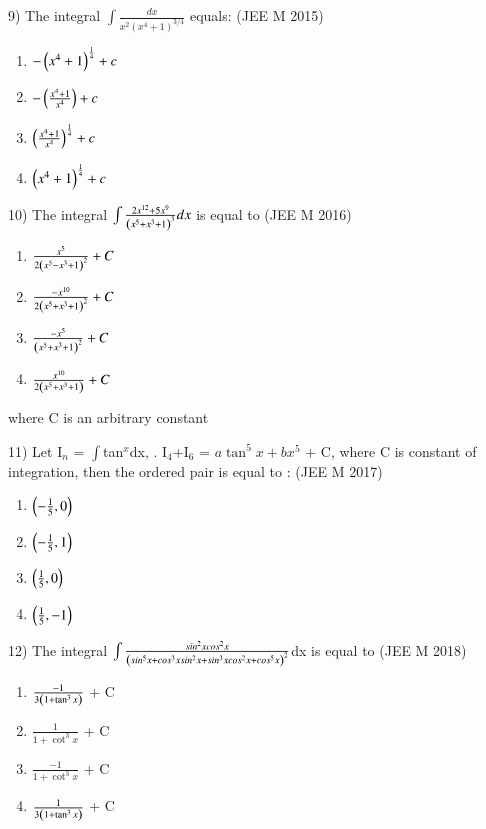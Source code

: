 \documentclass[journal,12pt,twocolumn]{IEEEtran}
\theoremstyle{remark}
\begin{document}
9)
	 The integral $\int\frac{dx}{x^2(x^4+1)^{3/4}}$ equals:
		\hfill{(JEE M 2015)}

		\begin{multicols}{2}
			\begin{enumerate}[label=(\alph*)]
				\item $-\left(x^4+1\right)^{\frac{1}{4}}+c$
				\item $-\left(\frac{x^4+1}{x^4}\right)+c$
				\item $\left(\frac{x^4+1}{x^4}\right)^{\frac{1}{4}}+c$
				\item $\left(x^4+1\right)^{\frac{1}{4}}+c$
			\end{enumerate}
		\end{multicols}

10)
	 The integral $\int\frac{2x^{12}+5x^9}{\left(x^5+x^3+1\right)^3}dx$ is equal to
		\hfill{(JEE M 2016)}

		\begin{multicols}{2}
			\begin{enumerate}[label=(\alph*)]
				\item $\frac{x^5}{2\left(x^5-x^3+1\right)^2}+C$
				\item $\frac{-x^{10}}{2\left(x^5+x^3+1\right)^2}+C$
				\item $\frac{-x^5}{\left(x^5+x^3+1\right)^2}+C$
				\item $\frac{x^{10}}{2\left(x^5+x^3+1\right)}+C$
			\end{enumerate}
		\end{multicols}
		where C is an arbitrary constant

11)
	 Let I$_n$ = $\int$tan$^x$dx, . I$_4$+I$_6$ = $a \tan^5x + bx^5$ + C, where C is constant of integration, then the ordered pair  is equal to :
		\hfill{(JEE M 2017)}

		\begin{multicols}{4}
			\begin{enumerate}[label=(\alph*)]
				\item $\left(-\frac{1}{5}, 0\right)$
				\item $\left(-\frac{1}{5}, 1\right)$
				\item $\left(\frac{1}{5}, 0\right)$
				\item $\left(\frac{1}{5},-1\right)$
			\end{enumerate}
		\end{multicols}
		
12)
	 The integral $\int\frac{sin^2xcos^2x}{\left(sin^5x+cos^3xsin^2x+sin^3xcos^2x+cos^5x\right)^2}$dx is equal to
		\hfill{(JEE M 2018)}
		
		\begin{multicols}{2}
			\begin{enumerate}[label=(\alph*)]
				\item $\frac{-1}{3\left(1+\tan ^3x\right)}$ + C
				\item $\frac{1}{1+\cot ^3x}$ + C
				\item $\frac{-1}{1+\cot ^3x}$ + C
				\item $\frac{1}{3\left(1+\tan ^3x\right)}$ + C
			\end{enumerate}
		\end{multicols}
		
\end{document}
